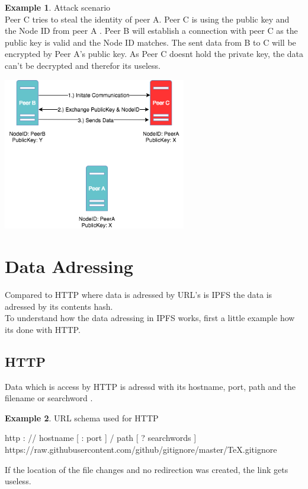 \documentclass[a4paper,11pt, oneside]{report}
\theoremstyle{definition}
\newtheorem{exmp}{Example}[subsection]
\begin{document}
\begin{exmp}  Attack scenario\\
Peer C tries to steal the identity of peer A. Peer C is using the public key and the Node ID from peer A . Peer B will establish a connection with peer C as the public key is valid and the Node ID matches. The sent data from B to C will be encrypted by Peer A's public key. As Peer C doesnt hold the private key, the data can't be decrypted and therefor its useless.
\begin{center}
\includegraphics[width=0.6\textwidth]{img/ipfs_peertrust_scenario_attack.png}\\[0.8cm]
\end{center}
\end{exmp}

\section{Data Adressing}
Compared to HTTP where data is adressed by URL's is IPFS the data is adressed by its contents hash.\\
To understand how the data adressing in IPFS works, first a little example how its done with HTTP.
\subsection{HTTP}
Data which is access by HTTP is adressd with its hostname, port, path and the filename or searchword \cite{HTTPAdressing}.
\begin{exmp} URL schema used for HTTP
\noindent
\begin{center}
http : // hostname [ : port ] / path [ ? searchwords ]\\
https://raw.githubusercontent.com/github/gitignore/master/TeX.gitignore
\end{center}
\end{exmp}
\noindent
If the location of the file changes and no redirection was created, the link gets useless.
\noindent
\end{document}
